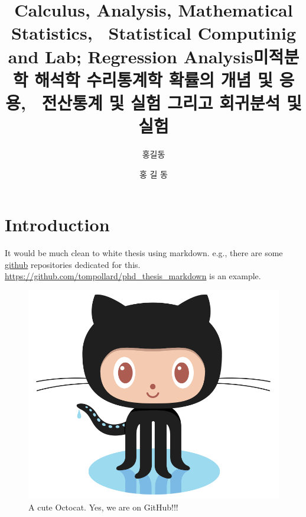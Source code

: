 \documentclass[oneside,phd,]{snuthesis}
\title{Calculus, Analysis, Mathematical Statistics, ~Statistical Computinig and
Lab; Regression Analysis}
\title*{미적분학 해석학 수리통계학 확률의 개념 및 응용, ~전산통계 및 실험 그리고
회귀분석 및 실험}
\author{홍길동}
\author*{홍 길 동} %
\begin{document}
\makefrontcover
\makefrontcover
\makeapproval

\cleardoublepage
{}

\begin{abstract}
\noindent

\end{abstract}

\tableofcontents
\listoffigures
\listoftables

\cleardoublepage
{}

%
%

\chapter{Introduction}\label{introduction}

It would be much clean to white thesis using markdown. e.g., there are
some \href{https://github.com}{github} repositories dedicated for this.
\url{https://github.com/tompollard/phd_thesis_markdown} is an example.

\begin{figure}
\begin{center}
\includegraphics[width=\textwidth]{figs/Octocat}
\end{center}
\caption{A cute Octocat. Yes, we are on GitHub!!!}
\end{figure}
\end{document}
